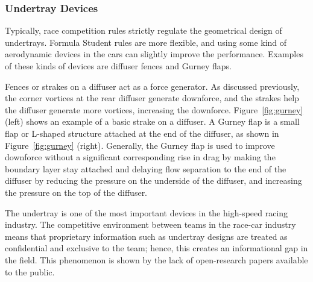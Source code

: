 \subsubsection{Undertray Devices}
Typically, race competition rules strictly regulate the geometrical design of undertrays. Formula Student rules are more flexible, and using some kind of aerodynamic devices in the cars can slightly improve the performance. Examples of these kinds of devices are diffuser fences and Gurney flaps.

\noindent Fences or strakes on a diffuser act as a force generator. As discussed previously, the corner vortices at the rear diffuser generate downforce, and the strakes help the diffuser generate more vortices, increasing the downforce. Figure~\ref{fig:gurney} (left) shows an example of a basic strake on a diffuser. A Gurney flap is a small flap or L-shaped structure attached at the end of the diffuser, as shown in Figure~\ref{fig:gurney} (right). Generally, the Gurney flap is used to improve downforce without a significant corresponding rise in drag \cite{Willemsen2012CFD-basedDiffuser} by making the boundary layer stay attached and delaying flow separation to the end of the diffuser by reducing the pressure on the underside of the diffuser, and increasing the pressure on the top of the diffuser. 

\noindent The undertray is one of the most important devices in the high-speed racing industry. The competitive environment between teams in the race-car industry means that proprietary information such as undertray designs are treated as confidential and exclusive to the team; hence, this creates an informational gap in the field. This phenomenon is shown by the lack of open-research papers available to the public.

